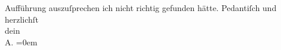 \begin{ledgroupsized}[t]{13cm}
               Aufführung auszuſprechen ich nicht richtig gefunden hätte.\pend
           \pstart
           Pedantiſch und herzlichſt{\\[\baselineskip]}dein{\\[\baselineskip]}\spacefill\mbox{A}.\pend
           \leftskip=0em{}
         
         \endnumbering{}\end{ledgroupsized}  \newcommand{\dateiname}{L01982}\newcommand{\titel}{Arthur Schnitzler an Hermann Bahr, 19. 11. 1910}\newcommand{\editorInnen}{ Kurt Ifkovits,  Martin Anton Müller}
      